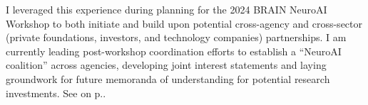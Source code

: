 \documentclass[10pt]{article}
\newcommand{\itemnote}[1]{
  \begin{description}
    \item[$\rightarrow$] \hspace{.09in}{\color{darkgray}\it #1}
  \end{description}
}
\newcommand{\see}[1]{[\textcolor{hopkinsblue}{p.\pageref{sec:#1}}]}
\newcommand{\cfonly}[1]{\textcolor{hopkinsblue}{\emph{\nameref{sec:#1}} on p.\pageref{sec:#1}}}
\newcommand{\cf}[1]{\textcolor{hopkinsblue}{See \emph{\nameref{sec:#1}} on p.\pageref{sec:#1}}}
\newcommand{\cfcf}[2]{\textcolor{hopkinsblue}{See \emph{\nameref{sec:#1}} on
  p.\pageref{sec:#1} and \emph{\nameref{sec:#2}} on p.\pageref{sec:#2}}}
\begin{document}
I leveraged this experience during planning for the 2024 BRAIN NeuroAI Workshop
to both initiate and build upon potential cross-agency and cross-sector (private
foundations, investors, and technology companies) partnerships. I am currently
leading post-workshop coordination efforts to establish a ``NeuroAI coalition''
across agencies, developing joint interest statements and laying groundwork
for future memoranda of understanding for potential research investments.
\cf{jobobd}.



\end{document}
